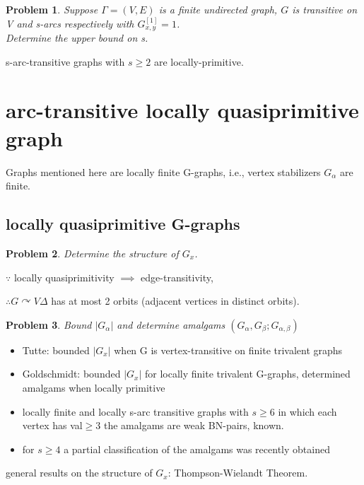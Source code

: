 \documentclass[a4,11pt]{article}
\newtheorem{problem}{Problem}[section]
\begin{document}
\begin{problem}
	Suppose $\Gamma = (V, E)$ is a finite undirected graph, $G$ is transitive on V and s-arcs respectively with $G_{x,y}^{[1]}=1$.\\Determine the upper bound on s.
\end{problem}

s-arc-transitive graphs with $s\geq 2$ are locally-primitive.


\section{arc-transitive locally quasiprimitive graph}

Graphs mentioned here are locally finite G-graphs, i.e., vertex stabilizers $G_\alpha$ are finite.

\subsection{locally quasiprimitive G-graphs}
\begin{problem}
	Determine the structure of $G_x$.
\end{problem}

$\because$ locally quasiprimitivity $\implies$ edge-transitivity, 

$\therefore G\curvearrowright V\Delta$ has at most 2 orbits (adjacent vertices in distinct orbits).

\begin{problem}
	Bound $|G_\alpha|$ and determine amalgams $(G_\alpha,G_\beta;G_{\alpha,\beta})$
\end{problem}

\begin{itemize}
	\item Tutte: bounded $|G_x|$ when G is vertex-transitive on finite trivalent graphs
	\item Goldschmidt: bounded $|G_x|$ for locally finite trivalent G-graphs, determined amalgams when locally primitive
	\item locally finite and locally s-arc transitive graphs with $s\geq 6$ in which each vertex has val$\geq 3$ the amalgams are weak BN-pairs, known.
	\item for $s\geq 4$ a partial classification of the amalgams was recently obtained 
\end{itemize}


general results on the structure of $G_x$: Thompson-Wielandt Theorem.
\end{document}
